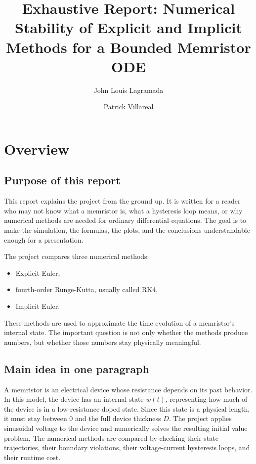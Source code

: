 \documentclass[11pt]{article}
\title{Exhaustive Report: Numerical Stability of Explicit and Implicit Methods for a Bounded Memristor ODE}
\author{John Louis Lagramada \and Patrick Villareal}
\date{}
\begin{document}
\maketitle
\tableofcontents
\newpage

\section{Overview}

\subsection{Purpose of this report}

This report explains the project from the ground up. It is written for a reader who may not know what a memristor is, what a hysteresis loop means, or why numerical methods are needed for ordinary differential equations. The goal is to make the simulation, the formulas, the plots, and the conclusions understandable enough for a presentation.

The project compares three numerical methods:
\begin{itemize}[noitemsep]
  \item Explicit Euler,
  \item fourth-order Runge-Kutta, usually called RK4,
  \item Implicit Euler.
\end{itemize}

These methods are used to approximate the time evolution of a memristor's internal state. The important question is not only whether the methods produce numbers, but whether those numbers stay physically meaningful.

\subsection{Main idea in one paragraph}

A memristor is an electrical device whose resistance depends on its past behavior. In this model, the device has an internal state \(w(t)\), representing how much of the device is in a low-resistance doped state. Since this state is a physical length, it must stay between \(0\) and the full device thickness \(D\). The project applies sinusoidal voltage to the device and numerically solves the resulting initial value problem. The numerical methods are compared by checking their state trajectories, their boundary violations, their voltage-current hysteresis loops, and their runtime cost.
\end{document}
